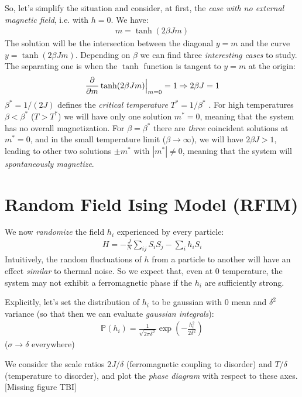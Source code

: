 \documentclass[../template.tex]{subfiles}
\begin{document}
So, let's simplify the situation and consider, at first, the \textit{case with no external magnetic field}, i.e. with $h = 0$. We have:
\begin{align*}
    m = \tanh (2 \beta J m)
\end{align*}
The solution will be the intersection between the diagonal $y=m$ and the curve $y=\tanh(2 \beta J m)$. Depending on $\beta$ we can find three \textit{interesting cases} to study. The separating one is when the $\tanh$ function is tangent  to $y=m$ at the origin:
\begin{align*}
    \pdv{m} \tanh(2 \beta J m) \Big|_{m = 0} = 1 \Rightarrow 2 \beta J = 1
\end{align*}   
$\beta^* = 1/(2J)$ defines the \textit{critical temperature} $T^* = 1/\beta^*$ . For high temperatures $\beta < \beta^*$ ($T > T^*$) we will have only one solution $m^* = 0$, meaning that the system has no overall magnetization. For $\beta = \beta^*$ there are \textit{three} coincident solutions at $m^* = 0$, and in the small temperature limit ($\beta \to \infty$), we will have $2 \beta J > 1$, leading to other two solutions $\pm m^*$ with $|m^*| \neq 0$, meaning that the system will \textit{spontaneously magnetize}.   

\section{Random Field Ising Model (RFIM)}
We now \textit{randomize} the field $h_i$ experienced by every particle:
\begin{align*}
    H = - \frac{J}{N} \sum_{ij} S_i S_j - \sum_i h_i S_i 
\end{align*}
Intuitively, the random fluctuations of $h$ from a particle to another will have an effect \textit{similar} to thermal noise. So we expect that, even at $0$ temperature, the system may not exhibit a ferromagnetic phase if the $h_i$ are sufficiently strong.

Explicitly, let's set the distribution of $h_i$ to be gaussian with $0$ mean and $\delta^2$ variance (so that then we can evaluate \textit{gaussian integrals}): 
\begin{align*}
    \mathbb{P}(h_i) = \frac{1}{\sqrt{2 \pi \delta^2}} \exp\left(-\frac{h_i^2}{2 \delta^2} \right)
\end{align*}
($\sigma \to \delta$ everywhere) 


We consider the scale ratios $2J/\delta$ (ferromagnetic coupling to disorder) and $T/\delta$ (temperature to disorder), and plot the \textit{phase diagram} with respect to these axes.
[Missing figure TBI]
\end{document}
